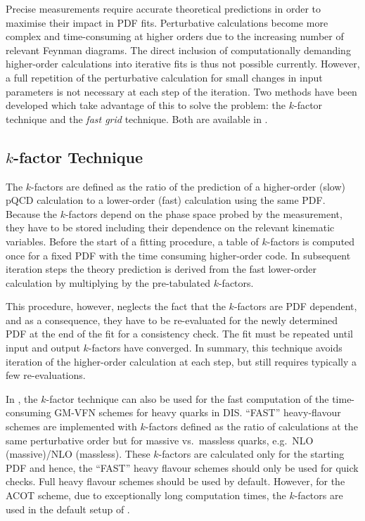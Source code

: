
Precise measurements
require accurate theoretical predictions in
order to maximise their impact in PDF fits.  Perturbative
calculations become more complex and time-consuming at higher  
orders due to the increasing number of relevant Feynman diagrams.
The direct inclusion of computationally
demanding higher-order calculations into iterative fits is thus
not possible currently. However, a full repetition of the
perturbative calculation for small changes in input parameters is
not necessary at each step of the iteration.
Two methods have been developed which take advantage of this
to solve the problem: the $k$-factor technique and the
\emph{fast grid} technique. Both are available in \fitter.

\subsection{$k$-factor Technique}
  The $k$-factors are defined as the ratio of the prediction of a
  higher-order (slow) pQCD calculation to a lower-order (fast)
  calculation using the same PDF. Because the $k$-factors depend on the phase space
  probed by the measurement, they have to be stored  
including their dependence on
  the relevant kinematic variables. Before the start of  
  a fitting procedure, a table of $k$-factors is computed once
  for a fixed PDF with the time consuming higher-order code. In
  subsequent iteration steps the theory prediction is derived from the
  fast lower-order calculation by multiplying by the pre-tabulated
  $k$-factors.

  This procedure, however, neglects the fact that the $k$-factors are 
  PDF dependent, and 
  as a consequence, they have to be re-evaluated
  for the newly determined PDF at the end of the fit for a consistency
  check. The fit must be repeated until input and output
  $k$-factors have converged. In summary, this technique avoids
  iteration of the higher-order calculation at each step, but still
  requires typically a few re-evaluations.

In \fitter, the $k$-factor technique can also be used for the fast 
computation of the time-consuming GM-VFN schemes for heavy quarks in DIS.
``FAST'' heavy-flavour schemes are implemented
with $k$-factors defined as the ratio of
calculations at the same perturbative order but for massive vs.\
massless quarks, e.g.\ NLO (massive)/NLO (massless).
These $k$-factors are calculated only for the
starting PDF and hence, the ``FAST'' heavy flavour schemes should
only be used for quick checks. Full heavy flavour schemes
should be used by default. However, for the ACOT scheme,
due to exceptionally long computation times, the $k$-factors are used in 
the default setup of \fitter. 

